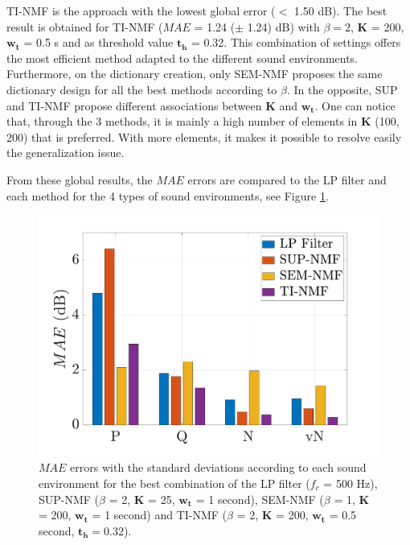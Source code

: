 \documentclass[review,5p,twocolumn,sort&compress,times]{elsarticle}
\begin{document}
TI-NMF is the approach with the lowest global error ($<$ 1.50 dB). The best result is obtained for TI-NMF ($MAE$ = 1.24 ($\pm$ 1.24) dB) with $\beta = 2$, $\mathbf{K}$ = 200, $\mathbf{w_t}$ = 0.5 s and as threshold value $\mathbf{t_h}$ = 0.32. This combination of settings offers the most efficient method adapted to the different sound environments.
Furthermore, on the dictionary creation, only SEM-NMF proposes the same dictionary design for all the best methods according to $\beta$. In the opposite, SUP and TI-NMF propose different associations between $\mathbf{K}$ and $\mathbf{w_t}$. One can notice that, through the 3 methods, it is mainly a high number of elements in $\mathbf{K}$ (100, 200) that is preferred. With more elements, it makes it possible to resolve easily the generalization issue. 

From these global results, the $MAE$ errors are compared to the LP filter and each method for the 4 types of sound environments, see Figure \ref{fig:mae_env}.

\begin{figure}[t]
\centering
\includegraphics[width=\linewidth]{figures/mea_grafic_bar.pdf}
\caption{$MAE$ errors with the standard deviations according to each sound environment for the best combination of the LP filter ($f_c$ = 500 Hz), SUP-NMF ($\beta$ = 2, $\mathbf{K}$ = 25, $\mathbf{w_t}$ = 1 second), SEM-NMF ($\beta$ = 1, $\mathbf{K}$ = 200, $\mathbf{w_t}$ = 1 second) and TI-NMF ($\beta$ = 2, $\mathbf{K}$ = 200, $\mathbf{w_t}$ = 0.5 second, $\mathbf{t_{h}} = 0.32$).}
\label{fig:mae_env}
\end{figure}
\end{document}
